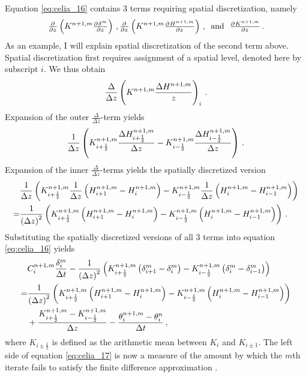Equation \eqref{eq:celia_16} contains 3 terms requiring spatial discretization, namely
\begin{equation*}
  \pd{}{z} \del{ K^{n+1,m} \pd{\delta^m}{z} } \, , \pd{}{z} \del{ K^{n+1,m} \pd{H^{n+1,m}}{z} } \, , \, \text{ and } \, \, \pd{K^{n+1,m}}{z} \, .
\end{equation*}
As an example, I will explain spatial discretization of the second term above.  Spatial discretization first requires assignment of a spatial level, denoted here by subscript $i$.  We thus obtain
\begin{equation*}
  \frac{\Delta}{\Delta z} \del{ K^{n+1,m}\frac{\Delta H^{n+1,m}}{z} }_i \, .
\end{equation*}
Expansion of the outer $\frac{\Delta}{\Delta z}$-term yields
\begin{equation*}
  \frac{1}{\Delta z} \del{ K_{i+\frac{1}{2}}^{n+1,m}\frac{\Delta H_{i+\frac{1}{2}}^{n+1,m}}{\Delta z} - K_{i-\frac{1}{2}}^{n+1,m}\frac{\Delta H_{i-\frac{1}{2}}^{n+1,m}}{\Delta z} } \, .
\end{equation*}
Expansion of the inner $\frac{\Delta}{\Delta z}$-terms yields the spatially discretized version
\begin{align*}
  &\frac{1}{\Delta z} \del{ K_{i+\frac{1}{2}}^{n+1,m}\frac{1}{\Delta z} \del{ H_{i+1}^{n+1,m} - H_{i}^{n+1,m} } - K_{i-\frac{1}{2}}^{n+1,m}\frac{1}{\Delta z} \del{ H_{i}^{n+1,m} - H_{i-1}^{n+1,m} } } \\
  = &\frac{1}{\del{ \Delta z }^2} \del{ K_{i+\frac{1}{2}}^{n+1,m} \del{ H_{i+1}^{n+1,m} - H_{i}^{n+1,m} } - K_{i-\frac{1}{2}}^{n+1,m} \del{ H_{i}^{n+1,m} - H_{i-1}^{n+1,m} } } \, .
\end{align*}
Substituting the spatially discretized versions of all 3 terms into equation \eqref{eq:celia_16} yields \parencite{celia_general_1990}
\begin{equation}
  \label{eq:celia_17}
  \begin{split}
    &C_i^{n+1,m} \frac{\delta_i^m}{\Delta t} - \frac{1}{\del{ \Delta z }^2} \del{ K_{i+\frac{1}{2}}^{n+1,m} \del{ \delta_{i+1}^{m} - \delta_{i}^{m} } - K_{i-\frac{1}{2}}^{n+1,m} \del{ \delta_{i}^{m} - \delta_{i-1}^{m} } } \\
    = &\frac{1}{\del{ \Delta z }^2} \del{ K_{i+\frac{1}{2}}^{n+1,m} \del{ H_{i+1}^{n+1,m} - H_{i}^{n+1,m} } - K_{i-\frac{1}{2}}^{n+1,m} \del{ H_{i}^{n+1,m} - H_{i-1}^{n+1,m} } } \\
    &+ \frac{K_{i+\frac{1}{2}}^{n+1,m} - K_{i-\frac{1}{2}}^{n+1,m}}{\Delta z} - \frac{\theta_i^{n+1,m} - \theta_i^{n}}{\Delta t} \, ,
  \end{split}
\end{equation}
where $K_{i\pm\frac{1}{2}}$ is defined as the arithmetic mean between $K_i$ and $K_{i\pm1}$.  The left side of equation \eqref{eq:celia_17} is now a measure of the amount by which the $m$th iterate fails to satisfy the finite difference approximation \parencite{celia_general_1990}.

